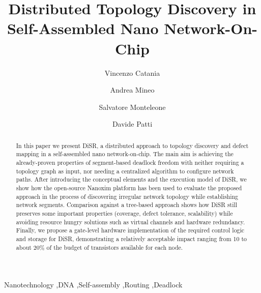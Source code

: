 \documentclass[preprint]{elsarticle}
\newcommand{\disr}{{\sf DiSR}}
\begin{document}
\begin{frontmatter}

\title{Distributed Topology Discovery in Self-Assembled Nano Network-On-Chip}

\author{Vincenzo Catania}
\author{Andrea Mineo}
\author{Salvatore Monteleone}
\author{Davide Patti}
\address{DIEEI, University of Catania, v.le Andrea Doria 6, 95125 Catania, Italy}






\begin{abstract}
In this paper we present \disr{}, a distributed approach to topology
discovery and defect mapping in a self-assembled nano
network-on-chip. The main aim is achieving the already-proven
properties of segment-based deadlock freedom with neither requiring
a topology graph as input, nor needing a centralized algorithm to
configure network paths.  After introducing the conceptual elements
and the execution model of \disr{}, we show how the open-source Nanoxim
platform has been used to evaluate the proposed approach in the
process of discovering irregular network topology while establishing
network segments. Comparison against a tree-based approach shows how
\disr{} still preserves some important properties (coverage, defect
tolerance, scalability) while avoiding resource hungry solutions such
as virtual channels and hardware redundancy. Finally, we propose a
gate-level hardware implementation of the required control logic and
storage for \disr{}, demonstrating a relatively acceptable impact
ranging from 10 to about 20\% of the budget of transistors available
for each node.
\end{abstract}

\begin{keyword}
Nanotechnology \sep DNA \sep Self-assembly \sep Routing \sep Deadlock
\end{keyword}
\end{frontmatter}
\end{document}

